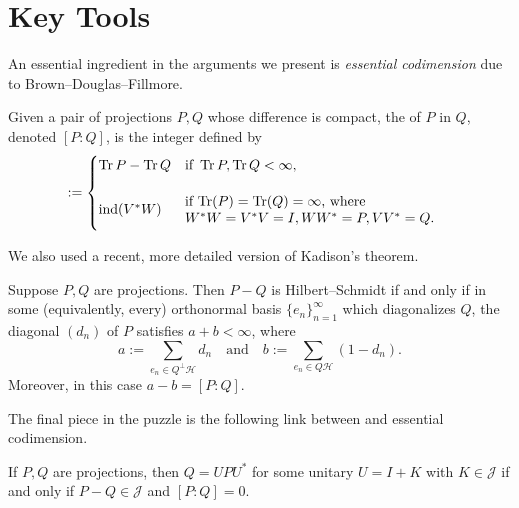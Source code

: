 \documentclass{article}
\DeclareMathOperator{\trace}{Tr}
\DeclareMathOperator{\ind}{ind}
\newcommand{\Hil}{\ensuremath{\mathcal{H}}}
\begin{document}
\vfill

\section*{Key Tools}

An essential ingredient in the arguments we present is \emph{essential codimension} due to Brown--Douglas--Fillmore.

\begin{definition}
  Given a pair of projections $P,Q$ whose difference is compact, the  of $P$ in $Q$, denoted $[P:Q]$, is the integer defined by
  \begin{equation*}
    [P:Q] :=
    \begin{cases}
      \trace P-\trace Q & \text{if}\ \trace P,\trace Q < \infty, \\[1em]
      \ind(V^{*}W) & \parbox[c][3em]{0.55\textwidth}{if $\trace(P) = \trace(Q) = \infty$, where \\
        $W^{*}W = V^{*}V = I, WW^{*} = P, VV^{*} = Q$.} \\[0.4em]
    \end{cases}
  \end{equation*}
\end{definition}

We also used a recent, more detailed version of Kadison's theorem.

\begin{theorem}
  Suppose $P,Q$ are projections. Then $P-Q$ is Hilbert--Schmidt if and only if in some (equivalently, every) orthonormal basis $\{e_n\}_{n=1}^{\infty}$ which diagonalizes $Q$, the diagonal $(d_n)$ of $P$ satisfies $a+b < \infty$, where
  \begin{equation*}
    a := \sum_{e_n \in Q^{\perp}\Hil} d_n \quad\text{and}\quad b := \sum_{e_n \in Q\Hil} (1-d_n).
  \end{equation*}
  Moreover, in this case $a-b = [P:Q]$.
\end{theorem}

The final piece in the puzzle is the following link between  and essential codimension.

\begin{proposition}
  If $P,Q$ are projections, then $Q = UPU^{*}$ for some unitary $U = I+K$ with $K \in \mathcal{J}$ if and only if $P-Q \in \mathcal{J}$ and $[P:Q] = 0$.
\end{proposition}

\end{document}
